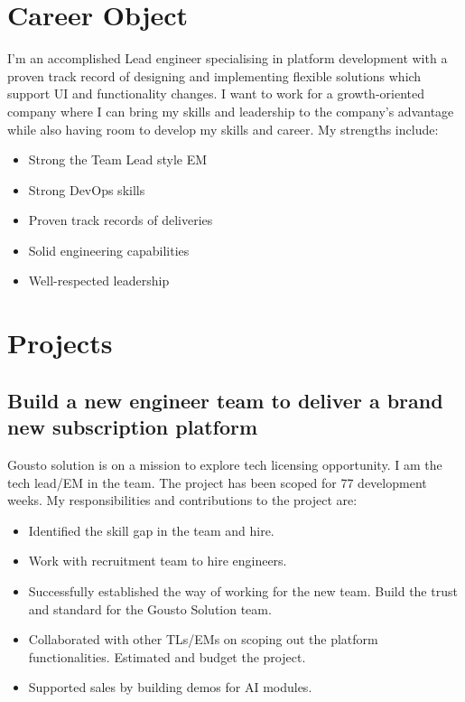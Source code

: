 \documentclass[a4paper]{twentysecondcv-english} %
\begin{document}
\section{Career Object}

I'm an accomplished Lead engineer specialising in platform development with a proven track record of designing and implementing flexible solutions which support UI and functionality changes. I want to work for a growth-oriented company where I can bring my skills and leadership to the company's advantage while also having room to develop my skills and career. My strengths include:
\begin{itemize}
  \item Strong the Team Lead style EM
  \item Strong DevOps skills
  \item Proven track records of deliveries
  \item Solid engineering capabilities
  \item Well-respected leadership
\end{itemize}

\section{Projects}

\subsection{Build a new engineer team to deliver a brand new subscription platform}

Gousto solution is on a mission to explore tech licensing opportunity. I am the tech lead/EM in the team. The project has been scoped for 77 development weeks. My responsibilities and contributions to the project are:
\begin{itemize}
    \item Identified the skill gap in the team and hire.
    \item Work with recruitment team to hire engineers.
    \item Successfully established the way of working for the new team. Build the trust and standard for the Gousto Solution team.
    \item Collaborated with other TLs/EMs on scoping out the platform functionalities. Estimated and budget the project.
    \item Supported sales by building demos for AI modules.
\end{itemize}
\end{document}
